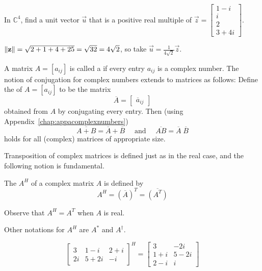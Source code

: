 \documentclass{ximera}
\begin{document}
\begin{example}\label{ex:025631}
In $\mathbb{C}^4$, find a unit vector $\vec{u}$ that is a positive real multiple of $\vec{z} = \begin{bmatrix} 1 - i\\ i\\ 2\\ 3 + 4i \end{bmatrix}$.


\begin{explanation}
$\left\lVert\mathbf{z}\right\rVert = \sqrt{2+1+4+25} = \sqrt{32} = 4\sqrt{2}$, so take $\vec{u} = \frac{1}{4\sqrt{2}}\vec{z}$.
\end{explanation}
\end{example}

A matrix $A = \left[ a_{ij} \right]$ is called a  if every entry $a_{ij}$ is a complex number. The notion of conjugation for complex numbers extends to matrices as follows: Define the  of $A = \left[ a_{ij} \right]$ to be the matrix
\begin{equation*}
\overline{A} = \left[ \begin{array}{c} \overline{a}_{ij} \end{array}\right]
\end{equation*}
obtained from $A$ by conjugating every entry. Then (using Appendix~\ref{chap:appacomplexnumbers})
\begin{equation*}
\overline{A + B} = \overline{A} + \overline{B} \quad \mbox{ and } \quad \overline{AB} = \overline{A} \; \overline{B}
\end{equation*}
holds for all (complex) matrices of appropriate size.

Transposition of complex matrices is defined just as in the real case, and the following notion is fundamental.


\begin{definition}\label{dfn:conjtrans}
The  $A^{H}$ of a complex matrix $A$ is defined by
\begin{equation*}
A^H = (\overline{A})^T = \overline{(A^T)}
\end{equation*}
\end{definition}

Observe that $A^{H} = A^{T}$ when $A$ is real.
\begin{remark}
    Other notations for $A^{H}$ are $A^\ast$ and $A^\dagger$.
\end{remark}

\begin{example}\label{ex:025654}
\begin{equation*}
\left[ \begin{array}{ccr}
3 & 1 - i & 2 + i \\
2i & 5 + 2i & -i
\end{array}\right]^H = \left[ \begin{array}{cc}
3 & -2i \\
1 + i & 5 - 2i \\
2 - i & i
\end{array}\right]
\end{equation*}
\end{example}
\end{document}
